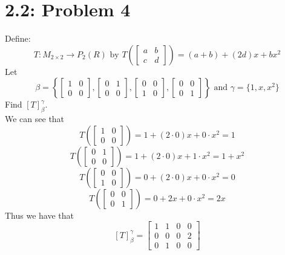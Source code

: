 \documentclass[answers,12pt,addpoints]{exam}
\begin{document}
\section*{2.2: Problem 4}
Define:
$$ T: M_{2 \times 2} \to P_2(R) \text{ by } T \left( \begin{bmatrix}
a & b \\ c & d
\end{bmatrix} \right) = (a + b) + (2d)x + bx^2$$
Let 
$$ \beta = \left\{ \begin{bmatrix}
1 & 0 \\ 0 & 0
\end{bmatrix}, \begin{bmatrix}
0 & 1 \\ 0 & 0
\end{bmatrix}, \begin{bmatrix}
0 & 0 \\ 1 & 0
\end{bmatrix}, \begin{bmatrix}
0 & 0 \\ 0 & 1
\end{bmatrix} \right\} \text{ and } \gamma = \{1, x, x^2\} $$
Find $[T]_{\beta}^{\gamma}$.\\
We can see that
$$ T \left( \begin{bmatrix}
1 & 0 \\ 0 & 0
\end{bmatrix} \right) = 1 + (2 \cdot 0)x + 0 \cdot x^2 = 1 $$
$$ T \left( \begin{bmatrix}
0 & 1 \\ 0 & 0
\end{bmatrix} \right) = 1 + (2 \cdot 0) x + 1 \cdot x^2 = 1 + x^2 $$
$$ T \left( \begin{bmatrix}
0 & 0 \\ 1 & 0
\end{bmatrix} \right) = 0 + (2 \cdot 0)x + 0 \cdot x^2 = 0 $$
$$ T \left( \begin{bmatrix}
0 & 0 \\ 0 & 1
\end{bmatrix} \right) = 0 + 2x + 0 \cdot x^2 = 2x $$
Thus we have that
$$ [T]_{\beta}^{\gamma} = \begin{bmatrix}
1 & 1 & 0 & 0 \\ 0 & 0 & 0 & 2 \\ 0 & 1 & 0 & 0
\end{bmatrix} $$
\end{document}
